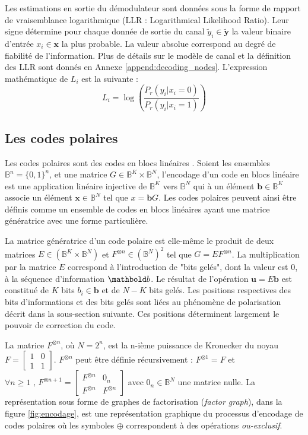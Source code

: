 Les estimations en sortie du démodulateur sont données sous la forme de rapport de vraisemblance logarithmique (LLR : Logarithmical Likelihood Ratio). Leur signe détermine pour chaque donnée de sortie du canal $\tilde{y}_i \in \mathbold{\tilde{y}}$ la valeur binaire d'entrée $x_i \in \mathbold{x}$ la plus probable. La valeur absolue correspond au degré de fiabilité de l'information. Plus de détails sur le modèle de canal et la définition des LLR sont donnés en Annexe \ref{append:decoding_nodes}. L'expression mathématique de $L_i$ est la suivante : 
\begin{equation*}
  L_i = \log\left(\dfrac{P_r(y_i | x_i = 0)}{P_r(y_i | x_i = 1)}\right)
\end{equation*}
\subsection{Les codes polaires}
Les codes polaires \cite{arikan_channel_2009} sont des codes en blocs linéaires \cite{morelos-zaragoza_art_2006}. Soient les ensembles $\mathbb{B}^n = \{0,1\}^n$, et une matrice $G \in \mathbb{B}^K \times \mathbb{B}^N$, l'encodage d'un code en blocs linéaire est une application linéaire injective de $\mathbb{B}^K$ vers $\mathbb{B}^N$ qui à un élément $\mathbold{b} \in \mathbb{B}^K$ associe un élément $\mathbold{x} \in \mathbb{B}^N$ tel que $x=\mathbold{b}G$. Les codes polaires peuvent ainsi être définis comme un ensemble de codes en blocs linéaires ayant une matrice génératrice avec une forme particulière.

La matrice génératrice d'un code polaire est elle-même le produit de deux matrices $E \in (\mathbb{B}^K \times \mathbb{B}^N)$ et $F^{\otimes n}\in (\mathbb{B}^N)^2$ tel que $G=EF^{\otimes n}$. La multiplication par la matrice $E$ correspond à l'introduction de "bits gelés", dont la valeur est $0$, à la séquence d'information $\mb{b}$. Le résultat de l'opération $\mathbold{u} = E\mathbold{b}$ est constitué de $K$ bits $b_i \in \mathbold{b}$ et de $N-K$ bits gelés. Les positions respectives des bits d'informations et des bits gelés sont liées au phénomène de polarisation décrit dans la sous-section suivante. Ces positions déterminent largement le pouvoir de correction du code.

La matrice $F^{\otimes n}$, où $N=2^n$, est la n-ième puissance de Kronecker du noyau $F=\left[\begin{smallmatrix} 1 & 0 \\ 1 & 1\end{smallmatrix}\right]$. $F^{\otimes n}$ peut être définie récursivement : $F^{\otimes 1} = F$ et $\forall {n \geq 1}\text{ , }{F^{\otimes n + 1}=\left[\begin{smallmatrix} F^{\otimes n} & 0_n \\ F^{\otimes n} & F^{\otimes n}\end{smallmatrix}\right]}$ avec $0_n \in \mathbb{B}^N$ une matrice nulle. La représentation sous forme de graphes de factorisation (\textit{factor graph}), dans la figure \ref{fig:encodage}, est une représentation graphique du processus d'encodage de codes polaires où les symboles $\oplus$ correspondent à des opérations \textit{ou-exclusif}. 


